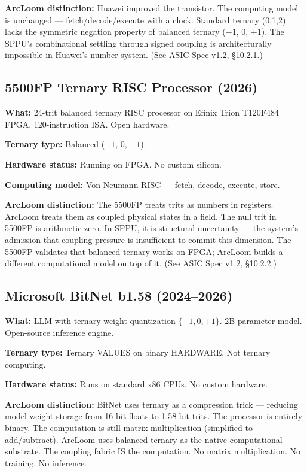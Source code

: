 \documentclass[11pt, a4paper]{article}
\begin{document}
\textbf{ArcLoom distinction:} Huawei improved the transistor. The
computing model is unchanged --- fetch/decode/execute with a clock.
Standard ternary (0,1,2) lacks the symmetric negation property of
balanced ternary ($-1$, 0, $+1$). The SPPU's combinational settling
through signed coupling is architecturally impossible in Huawei's
number system. (See ASIC Spec v1.2, \S10.2.1.)

\subsection{5500FP Ternary RISC Processor (2026)}

\textbf{What:} 24-trit balanced ternary RISC processor on Efinix
Trion T120F484 FPGA. 120-instruction ISA. Open hardware.

\textbf{Ternary type:} Balanced ($-1$, 0, $+1$).

\textbf{Hardware status:} Running on FPGA. No custom silicon.

\textbf{Computing model:} Von Neumann RISC --- fetch, decode, execute,
store.

\textbf{ArcLoom distinction:} The 5500FP treats trits as numbers in
registers. ArcLoom treats them as coupled physical states in a field.
The null trit in 5500FP is arithmetic zero. In SPPU, it is structural
uncertainty --- the system's admission that coupling pressure is
insufficient to commit this dimension. The 5500FP validates that
balanced ternary works on FPGA; ArcLoom builds a different
computational model on top of it. (See ASIC Spec v1.2, \S10.2.2.)

\subsection{Microsoft BitNet b1.58 (2024--2026)}

\textbf{What:} LLM with ternary weight quantization $\{-1, 0, +1\}$.
2B parameter model. Open-source inference engine.

\textbf{Ternary type:} Ternary VALUES on binary HARDWARE.
Not ternary computing.

\textbf{Hardware status:} Runs on standard x86 CPUs. No custom hardware.

\textbf{ArcLoom distinction:} BitNet uses ternary as a compression
trick --- reducing model weight storage from 16-bit floats to 1.58-bit
trits. The processor is entirely binary. The computation is still
matrix multiplication (simplified to add/subtract). ArcLoom uses
balanced ternary as the native computational substrate. The coupling
fabric IS the computation. No matrix multiplication. No training.
No inference.
\end{document}
